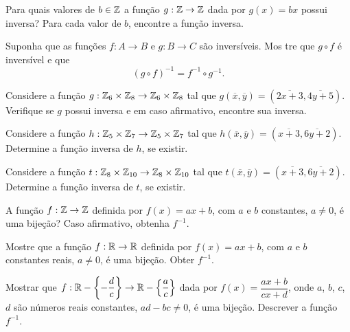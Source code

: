 \documentclass[12pt]{exam}
\begin{document}
\vspace{.3cm}

\questao{} Para quais valores de $b \in \mathbb{Z}$ a função $g : \mathbb{Z} \to \mathbb{Z}$ dada por $g(x)       = bx$ possui inversa? Para cada valor de $b$, encontre a função inversa.

\vspace{.3cm}

\questao{} Suponha que as funções $f : A \to B$ e $g : B \to C$ são inversíveis. Mos      tre que $g \circ f$ é inversível e que
\[
(g \circ f)^{-1} = f^{-1} \circ g^{-1}.
\]

\vspace{.3cm}

\questao{} Considere a função $g : \mathbb{Z}_6 \times \mathbb{Z}_8 \to \mathbb{Z}_6 \times \mathbb{Z}_8$ tal que $g(\overline{x},\overline{y}) = (\overline{2x + 3}, \overline{4y + 5})$. Verifique se $g$ possui inversa e em caso afirmativo, encontre sua inversa.

\vspace{.3cm}

\questao{} Considere a função $h : \mathbb{Z}_5 \times \mathbb{Z}_7 \to \mathbb{Z}_5 \times \mathbb{Z}_7$ tal que $h(\overline{x},\overline{y}) = (\overline{x + 3}, \overline{6y + 2})$. Determine a função inversa de $h$, se existir.

\vspace{.3cm}

\questao{} Considere a função $t : \mathbb{Z}_8 \times \mathbb{Z}_{10} \to \mathbb{Z}_8 \times \mathbb{Z}_{10}$ tal que $t(\overline{x},\overline{y}) = (\overline{x + 3}, \overline{6y + 2})$. Determine a função inversa de $t$, se existir.

\vspace{.3cm}

\questao{} A função $f : \mathbb{Z} \to \mathbb{Z}$ definida por $f(x) = ax + b$, com $a$ e $b$ constantes, $a \ne 0$, é uma bijeção? Caso afirmativo, obtenha $f^{-1}$.

\vspace{.3cm}


\questao{} Mostre que a função $f : \mathbb{R} \to \mathbb{R}$ definida por $f(x) = ax + b$, com $a$ e $b$ constantes reais, $a \ne 0$, é uma bijeção. Obter $f^{-1}$.

\vspace{.3cm}

\questao{} Mostrar que $f : \mathbb{R} - \left\{-\dfrac{d}{c}\right\} \to \mathbb{R}  - \left\{\dfrac{a}{c}\right\}$ dada por $f(x) =  \dfrac{ax + b}{cx + d}$, onde $a$, $b$, $c$, $d$ são n{\'u}meros reais constantes, $ad - bc \ne 0$, é uma bijeção. Descrever a função $f^{-1}$.
\end{document}
